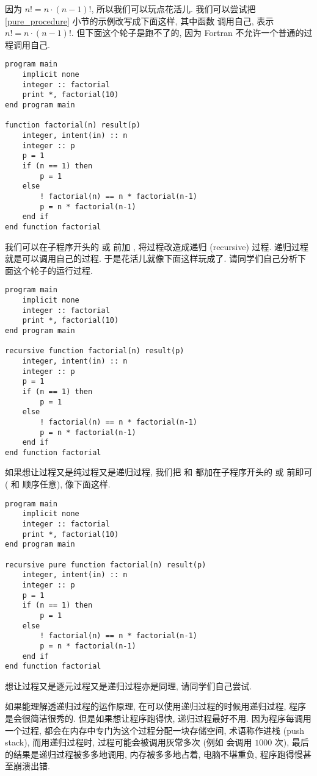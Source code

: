 因为 $n!=n\cdot(n-1)!$, 所以我们可以玩点花活儿. 我们可以尝试把 \ref{pure_procedure} 小节的示例改写成下面这样, 其中函数  调用自己, 表示 $n!=n\cdot(n-1)!$. 但下面这个轮子是跑不了的, 因为 Fortran 不允许一个普通的过程调用自己.
\begin{lstlisting}
program main
    implicit none
    integer :: factorial
    print *, factorial(10)
end program main

function factorial(n) result(p)
    integer, intent(in) :: n
    integer :: p 
    p = 1
    if (n == 1) then
        p = 1
    else
        ! factorial(n) == n * factorial(n-1)
        p = n * factorial(n-1)
    end if
end function factorial
\end{lstlisting}
我们可以在子程序开头的  或  前加 , 将过程改造成递归 (recursive) 过程. 递归过程就是可以调用自己的过程. 于是花活儿就像下面这样玩成了. 请同学们自己分析下面这个轮子的运行过程.
\begin{lstlisting}
program main
    implicit none
    integer :: factorial
    print *, factorial(10)
end program main

recursive function factorial(n) result(p)
    integer, intent(in) :: n
    integer :: p 
    p = 1
    if (n == 1) then
        p = 1
    else
        ! factorial(n) == n * factorial(n-1)
        p = n * factorial(n-1)
    end if
end function factorial
\end{lstlisting}

如果想让过程又是纯过程又是递归过程, 我们把  和  都加在子程序开头的  或  前即可 ( 和  顺序任意), 像下面这样.
\begin{lstlisting}
program main
    implicit none
    integer :: factorial
    print *, factorial(10)
end program main

recursive pure function factorial(n) result(p)
    integer, intent(in) :: n
    integer :: p 
    p = 1
    if (n == 1) then
        p = 1
    else
        ! factorial(n) == n * factorial(n-1)
        p = n * factorial(n-1)
    end if
end function factorial
\end{lstlisting}
想让过程又是逐元过程又是递归过程亦是同理, 请同学们自己尝试.

如果能理解透递归过程的运作原理, 在可以使用递归过程的时候用递归过程, 程序是会很简洁很秀的. 但是如果想让程序跑得快, 递归过程最好不用. 因为程序每调用一个过程, 都会在内存中专门为这个过程分配一块存储空间, 术语称作进栈 (push stack), 而用递归过程时, 过程可能会被调用灰常多次 (例如  会调用  $1000$ 次), 最后的结果是递归过程被多多地调用, 内存被多多地占着, 电脑不堪重负, 程序跑得慢甚至崩溃出错.

